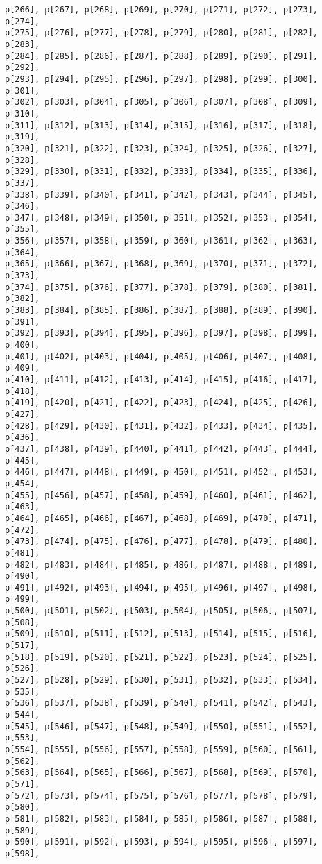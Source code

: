 \documentclass[
  letterpaper,
  DIV=11,
  numbers=noendperiod]{scrartcl}
\begin{document}
\begin{verbatim}
p[266], p[267], p[268], p[269], p[270], p[271], p[272], p[273], p[274],
p[275], p[276], p[277], p[278], p[279], p[280], p[281], p[282], p[283],
p[284], p[285], p[286], p[287], p[288], p[289], p[290], p[291], p[292],
p[293], p[294], p[295], p[296], p[297], p[298], p[299], p[300], p[301],
p[302], p[303], p[304], p[305], p[306], p[307], p[308], p[309], p[310],
p[311], p[312], p[313], p[314], p[315], p[316], p[317], p[318], p[319],
p[320], p[321], p[322], p[323], p[324], p[325], p[326], p[327], p[328],
p[329], p[330], p[331], p[332], p[333], p[334], p[335], p[336], p[337],
p[338], p[339], p[340], p[341], p[342], p[343], p[344], p[345], p[346],
p[347], p[348], p[349], p[350], p[351], p[352], p[353], p[354], p[355],
p[356], p[357], p[358], p[359], p[360], p[361], p[362], p[363], p[364],
p[365], p[366], p[367], p[368], p[369], p[370], p[371], p[372], p[373],
p[374], p[375], p[376], p[377], p[378], p[379], p[380], p[381], p[382],
p[383], p[384], p[385], p[386], p[387], p[388], p[389], p[390], p[391],
p[392], p[393], p[394], p[395], p[396], p[397], p[398], p[399], p[400],
p[401], p[402], p[403], p[404], p[405], p[406], p[407], p[408], p[409],
p[410], p[411], p[412], p[413], p[414], p[415], p[416], p[417], p[418],
p[419], p[420], p[421], p[422], p[423], p[424], p[425], p[426], p[427],
p[428], p[429], p[430], p[431], p[432], p[433], p[434], p[435], p[436],
p[437], p[438], p[439], p[440], p[441], p[442], p[443], p[444], p[445],
p[446], p[447], p[448], p[449], p[450], p[451], p[452], p[453], p[454],
p[455], p[456], p[457], p[458], p[459], p[460], p[461], p[462], p[463],
p[464], p[465], p[466], p[467], p[468], p[469], p[470], p[471], p[472],
p[473], p[474], p[475], p[476], p[477], p[478], p[479], p[480], p[481],
p[482], p[483], p[484], p[485], p[486], p[487], p[488], p[489], p[490],
p[491], p[492], p[493], p[494], p[495], p[496], p[497], p[498], p[499],
p[500], p[501], p[502], p[503], p[504], p[505], p[506], p[507], p[508],
p[509], p[510], p[511], p[512], p[513], p[514], p[515], p[516], p[517],
p[518], p[519], p[520], p[521], p[522], p[523], p[524], p[525], p[526],
p[527], p[528], p[529], p[530], p[531], p[532], p[533], p[534], p[535],
p[536], p[537], p[538], p[539], p[540], p[541], p[542], p[543], p[544],
p[545], p[546], p[547], p[548], p[549], p[550], p[551], p[552], p[553],
p[554], p[555], p[556], p[557], p[558], p[559], p[560], p[561], p[562],
p[563], p[564], p[565], p[566], p[567], p[568], p[569], p[570], p[571],
p[572], p[573], p[574], p[575], p[576], p[577], p[578], p[579], p[580],
p[581], p[582], p[583], p[584], p[585], p[586], p[587], p[588], p[589],
p[590], p[591], p[592], p[593], p[594], p[595], p[596], p[597], p[598],

\end{verbatim}
\end{document}
